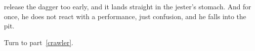 release the dagger too early, and it lands straight in the jester's stomach.
And for once, he does not react with a performance, just confusion, and he falls into the pit.

Turn to part~\vref{crawler}.

